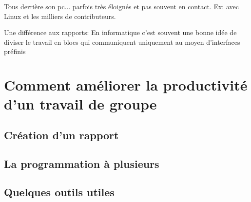 Tous derrière son pc... parfois très éloignés et pas souvent en contact. Ex: avec Linux et les milliers de contributeurs.

Une différence aux rapports: En informatique c'est souvent une bonne idée de diviser le travail en blocs qui communiquent uniquement au moyen d'interfaces préfinis

\section*{Comment améliorer la productivité d'un travail de groupe}

\subsection*{Création d'un rapport}

\subsection*{La programmation à plusieurs}

\subsection*{Quelques outils utiles}
                                                                                                                   

	
